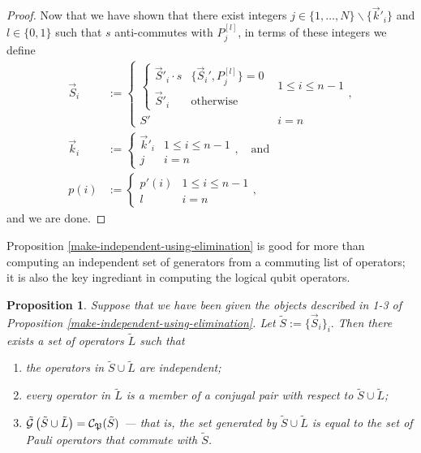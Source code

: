 \documentclass[twocolumn,showpacs,preprintnumbers,amsmath,amssymb,nofootinbib,pra,floatfix]{revtex4-1}
\newtheorem{proposition}{Proposition}
\newenvironment{remark}[1][Remark]{\begin{trivlist}
\item[\hskip \labelsep {\bfseries #1}]}{\end{trivlist}}
\newcommand{\lst}{\vec}
\newcommand{\set}{\tilde}
\newcommand{\genfun}{\tilde{\mathcal{G}}}
\newcommand{\pauligroup}{\mathfrak{P}}
\newcommand{\centralizer}{\mathcal{C}}
\begin{document}
\begin{proof}
Now that we have shown that there exist integers $j\in\{1,\dots,N\}\backslash\{\lst k'_i\}$ and $l\in\{0,1\}$ such that $s$ anti-commutes with $P_{j}^{[l]}$, in terms of these integers we define
$$
\begin{aligned}
\lst S_i &:= 
\begin{cases}
\begin{cases}
\lst S'_i \cdot s & \{\lst S_i',P_j^{[l]}\}=0 \\
\lst S'_i & \text{otherwise}
\end{cases} & 1\le i\le n-1 \\
S' & i=n
\end{cases}, \\
\lst k_i &:=
\begin{cases}
\lst k'_i & 1 \le i \le n-1 \\
j & i=n
\end{cases},\quad \text{and} \\
p(i) &:=
\begin{cases}
p'(i) & 1 \le i \le n-1\\
l & i=n
\end{cases},
\end{aligned}
$$ and we are done.
\end{proof}
\begin{remark}
Proposition \ref{make-independent-using-elimination} is good for more than computing an independent set of generators from a commuting list of operators;  it is also the key ingrediant in computing the logical qubit operators.
\end{remark}

\begin{proposition}
\label{construction-of-logicals}
Suppose that we have been given the objects described in 1-3 of Proposition \ref{make-independent-using-elimination}.  Let $\set S := \{\vec S_i\}_i.$  Then there exists a set of operators $\set L$ such that
\begin{enumerate}
\item \label{L-are-independent} the operators in $\set S\cup\set L$ are independent;
\item \label{L-are-conjugal-pairs} every operator in $\set L$ is a member of a conjugal pair with respect to $\set S\cup\set L$;
\item \label{L-completes-the-generators} $\genfun\paren{\set S\cup\set L}=\centralizer_\pauligroup(\set S)$ --- that is, the set generated by $\set S\cup\set L$ is equal to the set of Pauli operators that commute with $\set S$.
\end{enumerate}
\end{proposition}
\end{document}

